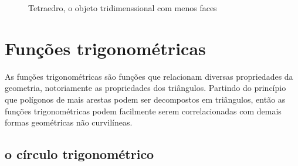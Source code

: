 \begin{multicols*}{2}
    \begin{figure}[H]
        \centering
        \caption{Tetraedro, o objeto tridimenssional com menos faces}
    \end{figure}

    \pagebreak

    \section*{Funções trigonométricas}
    As funções trigonométricas são funções que relacionam diversas propriedades
    da geometria, notoriamente as propriedades dos triângulos. Partindo do 
    princípio que polígonos de mais arestas podem ser decompostos em triângulos, 
    então as funções trigonométricas podem facilmente serem correlacionadas com 
    demais formas geométricas não curvilíneas.    

    \subsection*{o círculo trigonométrico}
    


\end{multicols*}
